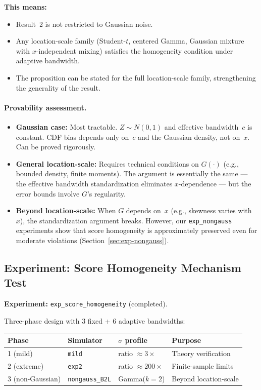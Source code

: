 \documentclass[11pt]{article}
\begin{document}
\textbf{This means:}
\begin{itemize}
  \item Result~2 is not restricted to Gaussian noise.
  \item Any location-scale family (Student-$t$, centered Gamma,
    Gaussian mixture with $x$-independent mixing) satisfies the
    homogeneity condition under adaptive bandwidth.
  \item The proposition can be stated for the full location-scale
    family, strengthening the generality of the result.
\end{itemize}

\paragraph{Provability assessment.}
\begin{itemize}
  \item \textbf{Gaussian case:} Most tractable. $Z \sim N(0,1)$ and
    effective bandwidth~$c$ is constant. CDF bias depends only on~$c$
    and the Gaussian density, not on~$x$. Can be proved rigorously.
  \item \textbf{General location-scale:} Requires technical conditions
    on $G(\cdot)$ (e.g., bounded density, finite moments). The
    argument is essentially the same --- the effective bandwidth
    standardization eliminates $x$-dependence --- but the error bounds
    involve $G$'s regularity.
  \item \textbf{Beyond location-scale:} When $G$ depends on~$x$ (e.g.,
    skewness varies with~$x$), the standardization argument breaks.
    However, our \texttt{exp\_nongauss} experiments show that score
    homogeneity is approximately preserved even for moderate violations
    (Section~\ref{sec:exp-nongauss}).
\end{itemize}

\subsection{Experiment: Score Homogeneity Mechanism Test}
\label{sec:exp-homog}

\textbf{Experiment:} \texttt{exp\_score\_homogeneity} (completed).

Three-phase design with 3 fixed + 6 adaptive bandwidths:
\begin{center}
\begin{tabular}{@{}llp{3.5cm}l@{}}
\toprule
\textbf{Phase} & \textbf{Simulator} & \textbf{$\sigma$ profile} & \textbf{Purpose} \\
\midrule
1 (mild)    & \texttt{mild}          & ratio $\approx 3\times$   & Theory verification \\
2 (extreme) & \texttt{exp2}          & ratio $\approx 200\times$ & Finite-sample limits \\
3 (non-Gaussian) & \texttt{nongauss\_B2L} & Gamma($k{=}2$)      & Beyond location-scale \\
\bottomrule
\end{tabular}
\end{center}
\end{document}
